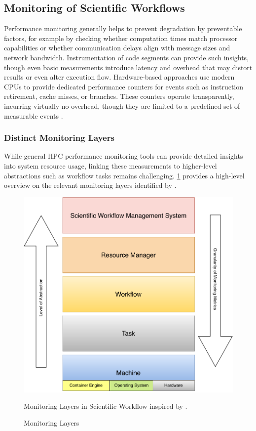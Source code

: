 \subsection{Monitoring of Scientific Workflows}
\label{sec:background_monitoring}
Performance monitoring generally helps to prevent degradation by preventable factors, for example by checking whether computation times match processor capabilities or whether communication delays align with message sizes and network bandwidth. Instrumentation of code segments can provide such insights, though even basic measurements introduce latency and overhead that may distort results or even alter execution flow. Hardware-based approaches use modern CPUs to provide dedicated performance counters for events such as instruction retirement, cache misses, or branches. These counters operate transparently, incurring virtually no overhead, though they are limited to a predefined set of measurable events \cite{STERLING201843} \cite{Witzke2024}.

\newpage
\subsubsection{Distinct Monitoring Layers}
\label{sec:background_monitoring_layers}
While general HPC performance monitoring tools can provide detailed insights into system resource usage, linking these measurements to higher-level abstractions such as workflow tasks remains challenging. \ref{fig:02-monitoring-layers} provides a high-level overview on the relevant monitoring layers identified by \cite{Bader_2022}.

\begin{figure}[H]
    \centering
    \includegraphics[scale=0.5]{fig/02/02-monitoring-layers.pdf}
    \small
    \caption{Monitoring Layers}
    \label{fig:02-monitoring-layers}
    \tiny
    Monitoring Layers in Scientific Workflow inspired by \cite{Bader_2022}.
\end{figure}


